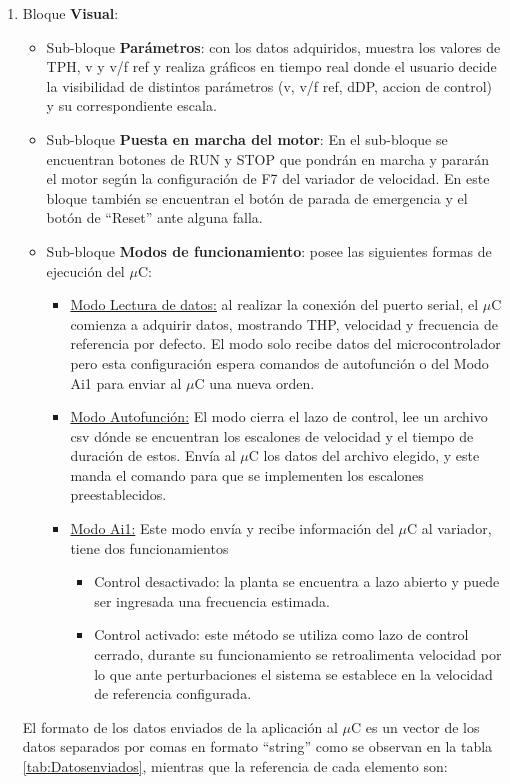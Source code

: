 \begin{enumerate}
\item Bloque \textbf{Visual}: 
\begin{itemize}
\item Sub-bloque \textbf{Parámetros}: con los datos adquiridos, muestra los valores de TPH, v y v/f ref y realiza gráficos en tiempo real donde el usuario decide la visibilidad de distintos parámetros (v, v/f ref, dDP, accion de control) y su correspondiente escala. 
\item Sub-bloque \textbf{Puesta en marcha del motor}: En el sub-bloque se encuentran botones de RUN y STOP que pondrán en marcha y pararán el motor según la configuración de F7 del variador de velocidad. En este bloque también se encuentran el botón de parada de emergencia y el botón de “Reset” ante alguna falla. 
\item Sub-bloque \textbf{Modos de funcionamiento}: posee las siguientes formas de ejecución del $\mu$C:
\begin{itemize}
\item \underline{Modo Lectura de datos:} al realizar la conexión del puerto serial, el $\mu$C comienza a adquirir datos, mostrando THP, velocidad y frecuencia de referencia por defecto. El modo solo recibe datos del microcontrolador pero esta configuración espera comandos de autofunción o del Modo Ai1 para enviar al $\mu$C una nueva orden.
\item \underline{Modo Autofunción:} El modo cierra el lazo de control, lee un archivo csv dónde se encuentran los escalones de velocidad y el tiempo de duración de estos. Envía al $\mu$C los datos del archivo elegido, y este manda el
comando para que se implementen los escalones preestablecidos.

\item \underline{Modo Ai1:} Este modo envía y recibe información del $\mu$C al variador, tiene dos funcionamientos
\begin{itemize}
\item Control desactivado: la planta se encuentra a lazo abierto y puede ser ingresada una frecuencia estimada.
\item Control activado: este método se utiliza como lazo de control cerrado, durante su funcionamiento se retroalimenta velocidad por lo que ante perturbaciones el sistema se establece en la velocidad de referencia configurada.
\end{itemize}
\end{itemize}
\end{itemize}


El formato de los datos enviados de la aplicación al $\mu$C es un vector de los datos separados por comas en formato “string” como se observan en la tabla \ref{tab:Datosenviados}, mientras que la referencia de cada elemento son:


\end{enumerate}
